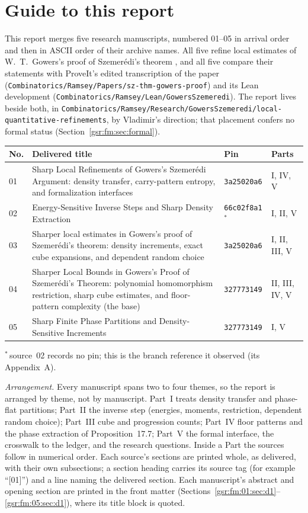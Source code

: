 \documentclass[11pt,letterpaper]{article}
\numberwithin{equation}{section}
\theoremstyle{definition}
\theoremstyle{remark}
\newcommand{\1}{\mathbf 1}
\newcommand{\file}[1]{\nolinkurl{#1}}
\begin{document}
\section{Guide to this report}\label{gsr:fm:sec:guide}
This report merges five research manuscripts, numbered 01--05 in arrival order and then in ASCII order of their archive names. All five refine local estimates of W.~T.~Gowers's proof of Szemer\'edi's theorem \cite{gowers}, and all five compare their statements with ProveIt's edited transcription of the paper (\file{Combinatorics/Ramsey/Papers/sz-thm-gowers-proof}) and its Lean development (\file{Combinatorics/Ramsey/Lean/GowersSzemeredi}). The report lives beside both, in \file{Combinatorics/Ramsey/Research/GowersSzemeredi/local-quantitative-refinements}, by Vladimir's direction; that placement confers no formal status (Section~\ref{gsr:fm:sec:formal}).
\begin{center}
\small
\begin{tabular}{@{}l >{\raggedright\arraybackslash}p{} l l@{}}
\toprule
No. & Delivered title & Pin & Parts\\
\midrule
01 & Sharp Local Refinements of Gowers's Szemer\'edi Argument: density transfer, carry-pattern entropy, and formalization interfaces & \texttt{3a25020a6} & I, IV, V\\
02 & Energy-Sensitive Inverse Steps and Sharp Density Extraction & \texttt{66c02f8a1}$^*$ & I, II, V\\
03 & Sharper local estimates in Gowers's proof of Szemer\'edi's theorem: density increments, exact cube expansions, and dependent random choice & \texttt{3a25020a6} & I, II, III, V\\
04 & Sharper Local Bounds in Gowers's Proof of Szemer\'edi's Theorem: polynomial homomorphism restriction, sharp cube estimates, and floor-pattern complexity (the base) & \texttt{327773149} & II, III, IV, V\\
05 & Sharp Finite Phase Partitions and Density-Sensitive Increments & \texttt{327773149} & I, V\\
\bottomrule
\end{tabular}

\smallskip
$^*$\,source~02 records no pin; this is the branch reference it observed (its Appendix~A).
\end{center}
\emph{Arrangement.} Every manuscript spans two to four themes, so the report is arranged by theme, not by manuscript. Part~I treats density transfer and phase-flat partitions; Part~II the inverse step (energies, moments, restriction, dependent random choice); Part~III cube and progression counts; Part~IV floor patterns and the phase extraction of Proposition~17.7; Part~V the formal interface, the crosswalk to the ledger, and the research questions. Inside a Part the sources follow in numerical order. Each source's sections are printed whole, as delivered, with their own subsections; a section heading carries its source tag (for example ``[01]'') and a line naming the delivered section. Each manuscript's abstract and opening section are printed in the front matter (Sections~\ref{gsr:fm:01:sec:d1}--\ref{gsr:fm:05:sec:d1}), where its title block is quoted.
\end{document}
